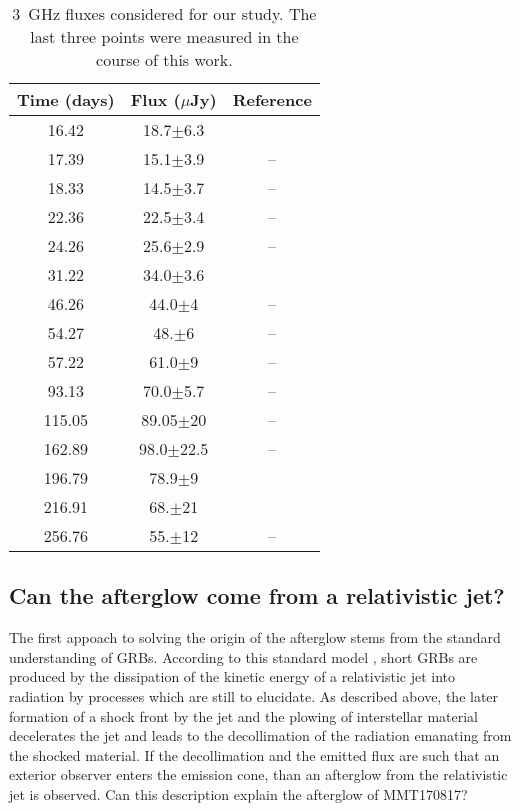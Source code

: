 \begin{table}
\begin{center}
\begin{tabular}{c|c|c}
\bf{Time (days)} & \bf{Flux ($\mu$Jy)} & \bf{Reference}\\
\hline
16.42 & 18.7$\pm$6.3 & \citep{12}\\
17.39 & 15.1$\pm$3.9 & --\\
18.33 & 14.5$\pm$3.7 & --\\
22.36 & 22.5$\pm$3.4 & --\\
24.26 &  25.6$\pm$2.9 & --\\
31.22 & 34.0$\pm$3.6 & \citep{5}\\
46.26 & 44.0$\pm$4 & --\\
54.27 &  48.$\pm$6 & --\\
57.22 & 61.0$\pm$9 & --\\
93.13 & 70.0$\pm$5.7 & --\\
115.05 & 89.05$\pm$20 & --\\
162.89 & 98.0$\pm$22.5 & --\\
196.79 & 78.9$\pm$9 & \citep{10}\\
216.91 & 68.$\pm$21 & \citep{17}\\
256.76 & 55.$\pm$12 & -- \\


\end{tabular}
\caption{3~GHz fluxes considered for our study. The last three points were measured in the course of this work.}
\label{radio}
\end{center}
\end{table}

\subsection{Can the afterglow come from a relativistic jet?}
The first appoach to solving the origin of the afterglow stems from the standard understanding of GRBs. According to this standard model \citep[see e.g.][sec. 5]{27, 28, 26}, short GRBs are produced by the dissipation of the kinetic energy of a relativistic jet into radiation by processes which are still to elucidate. As described above, the later formation of a shock front by the jet and the plowing of interstellar material decelerates the jet and leads to the decollimation of the radiation emanating from the shocked material. If the decollimation and the emitted flux are such that an exterior observer enters the emission cone, than an afterglow from the relativistic jet is observed. Can this description explain the afterglow of MMT170817?



